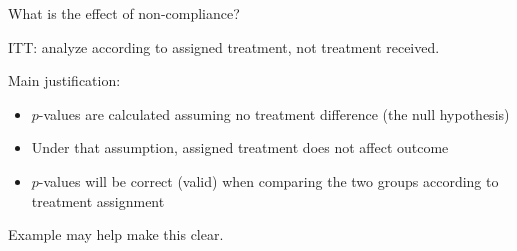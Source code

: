 \documentclass[ignorenonframetext,]{beamer}
\begin{document}
\begin{frame}{%
\protect\hypertarget{what-is-the-effect-of-non-compliance}{%
What is the effect of non-compliance?}}

ITT: analyze according to assigned treatment, not treatment received.
\medskip

Main justification:

\begin{itemize}
\item
  \(p\)-values are calculated assuming no treatment difference (the null
  hypothesis)
\item
  Under that assumption, assigned treatment does not affect outcome
\item
  \(p\)-values will be correct (valid) when comparing the two groups
  according to treatment assignment
\end{itemize}

Example may help make this clear.

\end{frame}
\end{document}
